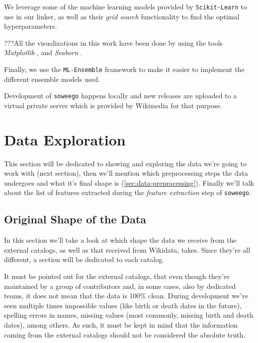 \documentclass[epsfig,a4paper,11pt,titlepage,twoside,openany]{book}
\begin{document}
We leverage some of the machine learning models provided by \texttt{Scikit-Learn} \cite{scikit-learn} to use in our linker, as well as their \textit{grid search} functionality to find the optimal hyperparameters.

???All the visualizations in this work have been done by using the tools \textit{Matplotlib} \cite{Hunter_Matplotlib}, and \textit{Seaborn} \cite{Seaborn}.%

Finally, we use the \texttt{ML-Ensemble} \cite{flennerhag:2017mlens} framework to make it easier to implement the different ensemble models used.


Development of \texttt{soweego} happens locally and new releases are uploaded to a virtual private server which is provided by Wikimedia for that purpose. 



\section{Data Exploration}
\label{sec:data-exploration}

This section will be dedicated to showing and exploring the data we're going to work with (next section), then we'll mention which preprocessing steps the data undergoes and what it's final shape is (\autoref{sec:data-preprocessing}). Finally we'll talk about the list of features extracted during the \textit{feature extraction} step of \texttt{soweego}.


\subsection{Original Shape of the Data}
\label{sec:orig-shape-of-data}

In this section we'll take a look at which shape the data we receive from the external catalogs, as well as that received from Wikidata, takes. Since they're all different, a section will be dedicated to each catalog. 

It must be pointed out for the external catalogs, that even though they're maintained by a group of contributors and, in some cases, also by dedicated teams, it does not mean that the data is 100\% clean. During development we've seen multiple times impossible values (like birth or death dates in the future), spelling errors in  names, missing values (most commonly, missing birth and death dates), among others. As such, it must be kept in mind that the information coming from the external catalogs should not be considered the absolute truth.
\end{document}
